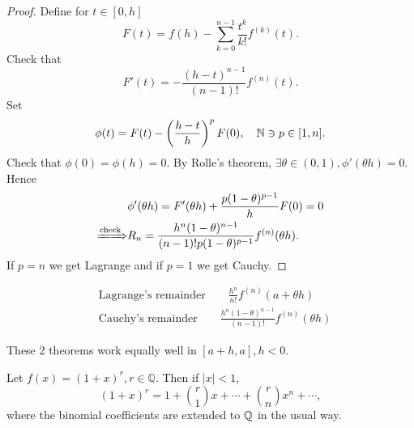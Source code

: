 \begin{proof}
    Define for $ t\in [0,h] $ 
    \[
        F(t) = f(h)-\sum_{k=0}^{n-1}\frac{t^k}{k!}f^{(k)}(t).
    \]
    Check that 
    \[
        F'(t) = - \frac{(h-t)^{n-1}}{(n-1)!}f^{(n)}(t).
    \]
    Set 
    \[
        \phi(t) = F(t) - \left( \frac{h-t}{h} \right)^p F(0),\quad {\mathbb{N}}\ni p \in [1,n].
    \]
    Check that $ \phi(0)=\phi(h)=0 $. By Rolle's theorem, $ \exists \theta\in (0,1), \phi'(\theta h)=0$. Hence
    \begin{align*}
        &\phi'(\theta h) = F'(\theta h) +\frac{p(1-\theta)^{p-1}}{h} F(0)=0\\ 
        \xRightarrow{\text{check}} &R_n=\frac{h^n(1-\theta)^{n-1}}{(n-1)!p(1-\theta)^{p-1}}f^{(n)}(\theta h).
    \end{align*}
    If $p=n$ we get Lagrange and if $p=1$ we get Cauchy.
\end{proof}
\begin{remark}
    \begin{align*}
        &\text{Lagrange's remainder}\qquad  \frac{h^n}{n!}f^{(n)}(a+\theta h)\\ 
        &\text{Cauchy's remainder}\qquad  \frac{h^n(1-\theta)^{n-1}}{(n-1)!}f^{(n)}(\theta h)
    \end{align*}
\end{remark}
\begin{remark}
    These 2 theorems work equally well in $ [a+h,a],h<0 $.
\end{remark}
\begin{example}
    Let $ f(x) = (1+x)^r,r\in \mathbb{Q} $. Then if $ |x|<1 $, 
    \[
        (1+x)^r = 1 + \binom{r}{1}x+ \cdots + \binom{r}{n}x^n+ \cdots ,
    \]
    where the binomial coefficients are extended to ${\mathbb{Q}}$ in the usual way.
\end{example}
